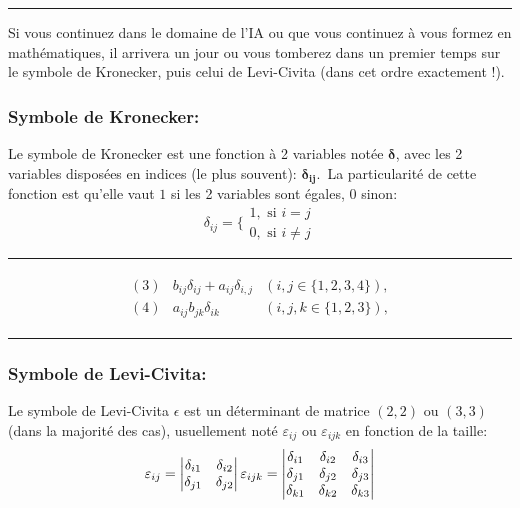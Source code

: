 \documentclass[11pt, french]{article}
\begin{document}
\noindent\rule{\textwidth}{1pt}
Si vous continuez dans le domaine de l'IA ou que vous continuez à vous formez en mathématiques, il arrivera un jour ou vous tomberez dans un premier temps sur le symbole de Kronecker, puis celui de Levi-Civita (dans cet ordre exactement !).
\subsubsection*{Symbole de Kronecker:}
Le symbole de Kronecker est une fonction à 2 variables notée $\mathbf{\delta}$, avec les 2 variables disposées en indices (le plus souvent): $\mathbf{\delta_{ij}}$.\
La particularité de cette fonction est qu'elle vaut $1$ si les 2 variables sont égales, $0$ sinon:
\begin{equation*}
\delta_{ij} = \bigg\{ \begin{matrix} 1,  \text{ si } i = j\\ 0,  \text{ si } i \ne j\end{matrix}
\end{equation*}

\noindent\rule{\textwidth}{1pt}

\begin{align*}
\begin{matrix}
(3) & b_{ij}\delta_{ij} + a_{ij}\delta_{i,j} & (i,j \in \{1, 2, 3, 4\}),\\
(4) & a_{ij}b_{jk}\delta_{ik} & (i,j,k \in \{1, 2, 3\}),
\end{matrix}
\end{align*}

\noindent\rule{\textwidth}{1pt}
\subsubsection*{Symbole de Levi-Civita:}
Le symbole de Levi-Civita $\epsilon$ est un déterminant de matrice $(2,2)$ ou $(3,3)$ (dans la majorité des cas), usuellement noté $\varepsilon_{ij}$ ou $\varepsilon_{ijk}$ en fonction de la taille:
\begin{equation*}
\varepsilon_{ij} = 
\begin{vmatrix}
\delta_{i1} & \delta_{i2} \\
\delta_{j1} & \delta_{j2}
\end{vmatrix}\\
\varepsilon_{ijk} = 
\begin{vmatrix}
\delta_{i1} & \delta_{i2} & \delta_{i3} \\
\delta_{j1} & \delta_{j2} & \delta_{j3} \\
\delta_{k1} & \delta_{k2} & \delta_{k3}
\end{vmatrix}
\end{equation*}
\end{document}
